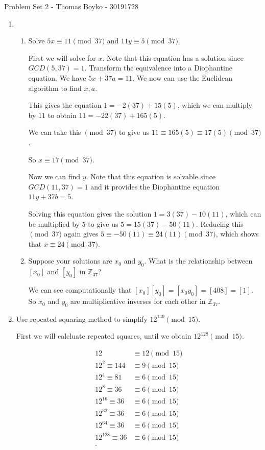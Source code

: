 \documentclass{article}
\begin{document}
    \huge Problem Set 2 - Thomas Boyko - 30191728
    \normalsize
\begin{enumerate} 

    \item \begin{enumerate}[label= (\alph*)] 
        \item  Solve $5x \equiv 11 \pmod{37}$ and $11 y \equiv 5 \pmod{37}$.

            First we will solve for $x$. Note that this equation has a solution since $GCD(5,37)=1$.
            Transform the equivalence into a Diophantine equation. We have $5x+37a=11$. We now can use 
            the Euclidean algorithm to find $x,a$. 

            This gives the equation $1=-2(37)+15(5)$, which we can multiply by $11$ to obtain 
            $11=-22(37)+165(5)$.

            We can take this $\pmod{37}$ to give us $11\equiv 165(5)\equiv 17(5) \pmod{37}$.

            So $x\equiv 17\pmod{37}$.

            Now we can find $y$. Note that this equation is solvable since $GCD(11,37)=1$
            and it provides the Diophantine equation $11y+37b=5$. 

            Solving this equation gives the solution $1=3(37)-10(11)$, which can be multiplied by $5$ to
            give us $5=15(37)-50(11)$. Reducing this $\pmod 37$ again gives 
            $5\equiv -50(11)\equiv 24(11)\pmod{37}$, which shows that $x\equiv 24\pmod{37}$.

        \item  Suppose your solutions are $x_0$ and $y_0$. What is the relationship between $[x_0]$ and
            $[y_0]$ in $\mathbb{Z}_{37}$?

            We can see computationally that $[x_0][y_0] =[x_0y_0]=[408]=[1]$. So $x_0$ and $y_0$ are 
        multiplicative inverses for each other in $\mathbb{Z}_{37}$.
\end{enumerate}

\item Use repeated squaring method to simplify $12^{149}\pmod{15}$.

First we will calcluate repeated squares, until we obtain $12^{128}\pmod{15}$.

\begin{align*}
    12&\equiv 12\pmod{15}\\
    12^2\equiv 144 &\equiv 9\pmod{15}\\
    12^{4}\equiv 81&\equiv 6\pmod{15}\\
    12^{8}\equiv 36&\equiv 6\pmod{15}\\
    12^{16}\equiv 36&\equiv 6\pmod{15}\\
    12^{32}\equiv 36&\equiv 6\pmod{15}\\
    12^{64}\equiv 36&\equiv 6\pmod{15}\\
    12^{128}\equiv 36&\equiv 6\pmod{15}\\
.\end{align*}


\end{enumerate}
\end{document}
